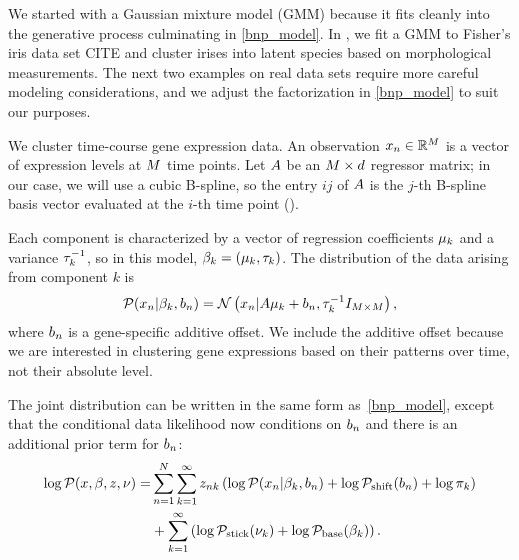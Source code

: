 We started with a Gaussian mixture model (GMM)
because it fits cleanly into the
generative process culminating in \eqref{bnp_model}.
In , we fit a GMM to Fisher's iris data set CITE and
cluster irises into latent species based on morphological measurements.
The next two examples on real data sets require more careful modeling considerations,
and we adjust the factorization in \eqref{bnp_model} to suit our purposes.


\begin{ex}

We cluster time-course gene expression data.
An observation $x_n\in\mathbb{R}^M$ is a vector of
expression levels at $M$
time points.
Let $A$ be an $M \times d$ regressor matrix;
in our case, we will use a cubic B-spline, so the entry $ij$ of $A$
is the $j$-th B-spline basis vector evaluated at the
$i$-th time point ().

Each component is characterized by a vector of regression coefficients
$\mu_k$ and a variance $\tau^{-1}_k$, so
in this model, $\beta_k = (\mu_k, \tau_k)$.
The distribution of the data arising from component $k$ is
\begin{align*}
\mathcal{P}(x_n | \beta_k, b_n) =
\mathcal{N}\left(x_n | A\mu_k + b_n,
\tau_k^{-1}I_{M \times M}\right),
\end{align*}
%
where $b_{n}$ is a gene-specific additive offset.
We include the additive offset because we
are interested in clustering gene expressions based on their patterns over time,
not their absolute level.

The joint distribution can be written in the same form as~\eqref{bnp_model},
except that the conditional data likelihood now conditions on $b_n$
and there is an additional prior term for $b_n$:
\begin{align*}
\log \mathcal{P}(x, \beta, z, \nu) =&
    \sum_{n=1}^N \sum_{k=1}^{\infty}
        z_{nk} \left(
            \log \mathcal{P}(x_n \vert \beta_k, b_n) + \log \mathcal{P}_{\mathrm{shift}}(b_n) + \log \pi_k
        \right)  \\
    &{} + \sum_{k=1}^{\infty} \left(
        \log \mathcal{P}_{\mathrm{stick}}(\nu_{k}) + \log \mathcal{P}_{\mathrm{base}}(\beta_k)
    \right).
\end{align*}

\end{ex}

